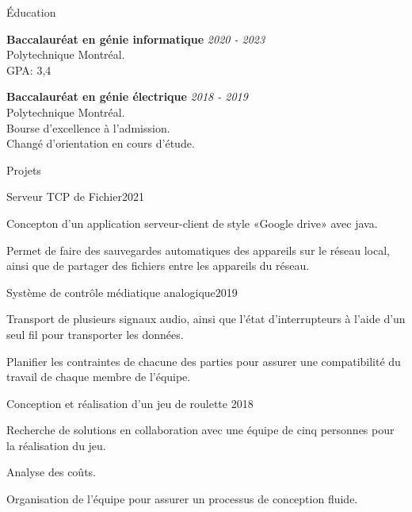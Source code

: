 \documentclass[french,12pt]{resume} %
\begin{document}
	
	
	\begin{rSection}{Éducation}
		
		{\bf Baccalauréat en génie informatique} \hfill {\em  2020 - 2023} 
		\\ Polytechnique Montréal.
		\\GPA: 3,4 
		
		
		{\bf Baccalauréat en génie électrique} \hfill {\em  2018 - 2019} 
		\\ Polytechnique Montréal.
		\\ Bourse d'excellence à l'admission.
		\\ Changé d'orientation en cours d'étude.
		
	\end{rSection}
	
	
	\begin{rSection}{Projets}
		\begin{rSubsection}{Serveur TCP de Fichier}{2021}{}{}
			\item Concepton d'un application serveur-client de style «Google drive» avec java.
			\item Permet de faire des sauvegardes automatiques des appareils sur le réseau local, ainsi que de partager des fichiers entre les appareils du réseau.
		\end{rSubsection}
		
		\begin{rSubsection}{Système de contrôle médiatique analogique}{2019}{}{}
			\item   Transport de plusieurs signaux audio, ainsi que l'état d'interrupteurs à l'aide d'un seul fil pour transporter les données.
			\item Planifier les contraintes de chacune des parties pour assurer une compatibilité du travail de chaque membre de l'équipe.
		\end{rSubsection}

		
		\begin{rSubsection}{Conception et réalisation d’un jeu de roulette }{2018}{}{}
			\item  Recherche de solutions en collaboration avec une équipe de cinq personnes pour la réalisation du jeu.
			\item  Analyse des coûts.
			\item Organisation de l'équipe pour assurer un processus de conception fluide.
		\end{rSubsection} 

		
	\end{rSection}
	
\end{document}
